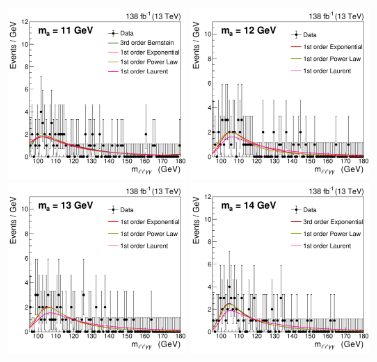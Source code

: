 \begin{figure}[htbp]
  \begin{center}
		\includegraphics[width=0.42\textwidth]{Thesis (Version 2246)/figures/chapter04/inter_mass_bkg/bkgplot_m11.pdf}
        \includegraphics[width=0.42\textwidth]{Thesis (Version 2246)/figures/chapter04/inter_mass_bkg/bkgplot_m12.pdf} \\
		\includegraphics[width=0.42\textwidth]{Thesis (Version 2246)/figures/chapter04/inter_mass_bkg/bkgplot_m13.pdf}
		\includegraphics[width=0.42\textwidth]{Thesis (Version 2246)/figures/chapter04/inter_mass_bkg/bkgplot_m14.pdf}\\
\end{center}
\end{figure}

